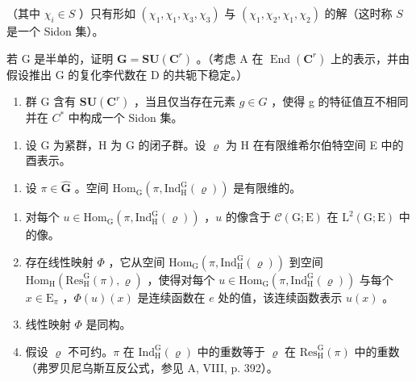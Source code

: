 （其中 \(\chi_{i} \in S\) ）只有形如 \((\chi_{1}, \chi_{1}, \chi_{3}, \chi_{3})\) 与 \((\chi_{1}, \chi_{2}, \chi_{1}, \chi_{2})\) 的解（这时称 \(S\) 是一个 Sidon 集）。

若 G 是半单的，证明 \(\mathbf{G} = \mathbf{S}\mathbf{U}(\mathbf{C}^{r})\) 。（考虑 A 在 \(\operatorname{End}(\mathbf{C}^{r})\) 上的表示，并由假设推出 G 的复化李代数在 D 的共轭下稳定。）

\begin{enumerate}
\def\labelenumi{\alph{enumi})}
\setcounter{enumi}{1}
\tightlist
\item
  群 G 含有 \(\mathbf{SU}(\mathbf{C}^{r})\) ，当且仅当存在元素 \(g \in G\) ，使得 g 的特征值互不相同并在 \(C^{*}\) 中构成一个 Sidon 集。
\end{enumerate}

\begin{enumerate}
\def\labelenumi{\arabic{enumi})}
\setcounter{enumi}{16}
\tightlist
\item
  设 G 为紧群，H 为 G 的闭子群。设 \(\varrho\) 为 H 在有限维希尔伯特空间 E 中的酉表示。
\end{enumerate}

\begin{enumerate}
\def\labelenumi{\alph{enumi})}
\tightlist
\item
  设 \(\pi \in \widehat{\mathbf{G}}\) 。空间 \(\mathrm{Hom}_{\mathrm{G}}(\pi, \mathrm{Ind}_{\mathrm{H}}^{\mathrm{G}}(\varrho))\) 是有限维的。

\end{enumerate}

\begin{enumerate}
\def\labelenumi{\alph{enumi})}
\setcounter{enumi}{1}
\item
  对每个 \(u \in \mathrm{Hom}_{\mathrm{G}}(\pi, \mathrm{Ind}_{\mathrm{H}}^{\mathrm{G}}(\varrho))\) ，\(u\) 的像含于 \(\mathcal{C}(\mathrm{G};\mathrm{E})\) 在 \(\mathrm{L}^2 (\mathrm{G};\mathrm{E})\) 中的像。
\item
  存在线性映射 \(\Phi\) ，它从空间 \(\mathrm{Hom}_{\mathrm{G}}(\pi, \mathrm{Ind}_{\mathrm{H}}^{\mathrm{G}}(\varrho))\) 到空间 \(\mathrm{Hom}_{\mathrm{H}}(\mathrm{Res}_{\mathrm{H}}^{\mathrm{G}}(\pi), \varrho)\) ，使得对每个 \(u \in \mathrm{Hom}_{\mathrm{G}}(\pi, \mathrm{Ind}_{\mathrm{H}}^{\mathrm{G}}(\varrho))\) 与每个 \(x \in \mathrm{E}_{\pi}\) ，\(\Phi(u)(x)\) 是连续函数在 \(e\) 处的值，该连续函数表示 \(u(x)\) 。
\item
  线性映射 \(\Phi\) 是同构。
\item
  假设 \(\varrho\) 不可约。\(\pi\) 在 \(\mathrm{Ind}_{\mathrm{H}}^{\mathrm{G}}(\varrho)\) 中的重数等于 \(\varrho\) 在 \(\mathrm{Res}_{\mathrm{H}}^{\mathrm{G}}(\pi)\) 中的重数（弗罗贝尼乌斯互反公式，参见 A, VIII, p. 392）。
\end{enumerate}

